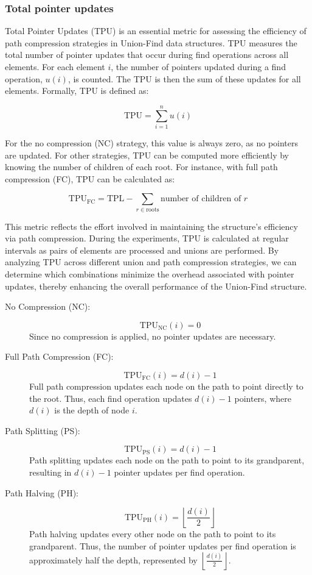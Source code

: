 \documentclass[10pt,a4paper,hidelinks]{article}
\begin{document}
\subsubsection{Total pointer updates}
Total Pointer Updates (TPU) is an essential metric for assessing the efficiency of path compression strategies in Union-Find data structures. TPU measures the total number of pointer updates that occur during find operations across all elements. For each element $i$, the number of pointers updated during a find operation, $u(i)$, is counted. The TPU is then the sum of these updates for all elements. Formally, TPU is defined as:

$$\text{TPU} = \sum_{i=1}^{n} u(i)$$

For the no compression (NC) strategy, this value is always zero, as no pointers are updated. For other strategies, TPU can be computed more efficiently by knowing the number of children of each root. For instance, with full path compression (FC), TPU can be calculated as:

$$\text{TPU}_{\text{FC}} = \text{TPL} - \sum_{r \in \text{roots}} \text{number of children of } r$$

This metric reflects the effort involved in maintaining the structure's efficiency via path compression. During the experiments, TPU is calculated at regular intervals as pairs of elements are processed and unions are performed. By analyzing TPU across different union and path compression strategies, we can determine which combinations minimize the overhead associated with pointer updates, thereby enhancing the overall performance of the Union-Find structure.


\begin{description}
    \item[No Compression (NC):]
      \[
      \text{TPU}_{\text{NC}}(i) = 0
      \]
      Since no compression is applied, no pointer updates are necessary.
    
    \item[Full Path Compression (FC):]
      \[
      \text{TPU}_{\text{FC}}(i) = d(i) - 1
      \]
      Full path compression updates each node on the path to point directly to the root. Thus, each find operation updates $d(i) - 1$ pointers, where $d(i)$ is the depth of node $i$.
    
    \item[Path Splitting (PS):]
      \[
      \text{TPU}_{\text{PS}}(i) = d(i) - 1
      \]
      Path splitting updates each node on the path to point to its grandparent, resulting in $d(i) - 1$ pointer updates per find operation.
    
    \item[Path Halving (PH):]
      \[
      \text{TPU}_{\text{PH}}(i) = \left\lfloor \frac{d(i)}{2} \right\rfloor
      \]
      Path halving updates every other node on the path to point to its grandparent. Thus, the number of pointer updates per find operation is approximately half the depth, represented by $\left\lfloor \frac{d(i)}{2} \right\rfloor$.
\end{description}
\end{document}
